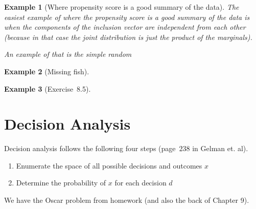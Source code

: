 \documentclass{article}
\newtheorem{example}{Example}
\begin{document}
\begin{example}[Where propensity score is a good summary of the data]
	The easiest example of where the propensity score is a good summary of
	the data is when the components of the inclusion vector are independent
	from each other (because in that case the joint distribution is just
	the product of the marginals).

	An example of that is the simple random
\end{example}

\begin{example}[Missing fish]
\end{example}

\begin{example}[Exercise~8.5]
\end{example}

\section{Decision Analysis}

Decision analysis follows the following four steps (page~$238$ in Gelman et. al).
\begin{enumerate}
	\item 
		Enumerate the space of all possible decisions and outcomes $x$
	\item
		Determine the probability of $x$ for each decision $d$
\end{enumerate}

We have the Oscar problem from homework (and also the back of Chapter 9).
\end{document}
